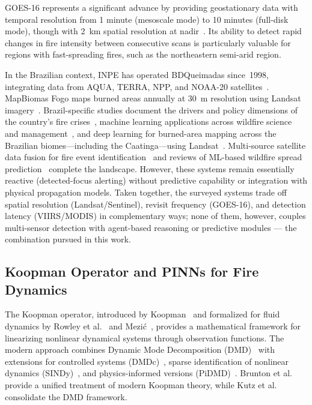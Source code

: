 \documentclass[preprint,12pt,times,numbers]{elsarticle}
\begin{document}
GOES-16 represents a significant advance by providing geostationary data with temporal resolution from 1 minute (mesoscale mode) to 10 minutes (full-disk mode), though with 2~km spatial resolution at nadir~\cite{techreport:goes2022}. Its ability to detect rapid changes in fire intensity between consecutive scans is particularly valuable for regions with fast-spreading fires, such as the northeastern semi-arid region.

In the Brazilian context, INPE has operated BDQueimadas since~1998, integrating data from AQUA, TERRA, NPP, and NOAA-20 satellites~\cite{article:inpe2023}. MapBiomas Fogo maps burned areas annually at 30~m resolution using Landsat imagery~\cite{website:mapbiomas}. Brazil-specific studies document the drivers and policy dimensions of the country's fire crises~\cite{article:barlow2019,article:pivello2021}, machine learning applications across wildfire science and management~\cite{article:jain2020}, and deep learning for burned-area mapping across the Brazilian biomes---including the Caatinga---using Landsat~\cite{article:alencar2022}. Multi-source satellite data fusion for fire event identification~\cite{article:chen2026} and reviews of ML-based wildfire spread prediction~\cite{article:andrianarivony2024} complete the landscape. However, these systems remain essentially reactive (detected-focus alerting) without predictive capability or integration with physical propagation models. Taken together, the surveyed systems trade off spatial resolution (Landsat/Sentinel), revisit frequency (GOES-16), and detection latency (VIIRS/MODIS) in complementary ways; none of them, however, couples multi-sensor detection with agent-based reasoning or predictive modules --- the combination pursued in this work.

\subsection{Koopman Operator and PINNs for Fire Dynamics}

The Koopman operator, introduced by Koopman~\cite{article:koopman1931} and formalized for fluid dynamics by Rowley et al.~\cite{article:rowley2009} and Mezić~\cite{article:mezic2013}, provides a mathematical framework for linearizing nonlinear dynamical systems through observation functions. The modern approach combines Dynamic Mode Decomposition (DMD)~\cite{article:schmid2010} with extensions for controlled systems (DMDc)~\cite{article:proctor2016}, sparse identification of nonlinear dynamics (SINDy)~\cite{article:brunton2016sindy}, and physics-informed versions (PiDMD)~\cite{article:baddoo2023}. Brunton et al.~\cite{article:brunton2021} provide a unified treatment of modern Koopman theory, while Kutz et al.~\cite{article:kutz2016} consolidate the DMD framework.
\end{document}
